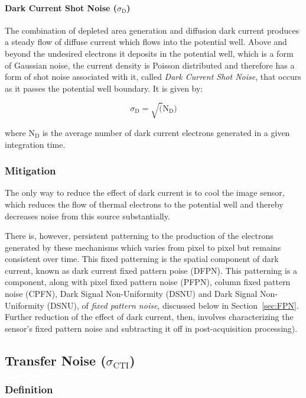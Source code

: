 \documentclass[10pt]{article}
\begin{document}
\paragraph{Dark Current Shot Noise (\boldmath $\sigma_{\text{D}}$)}
The combination of depleted area generation and diffusion dark current produces a steady flow of diffuse current which flows into the potential well. Above and beyond the undesired electrons it deposits in the potential well, which is a form of Gaussian noise, the current density is Poisson distributed and therefore has a form of shot noise associated with it, called \emph{Dark Current Shot Noise}, that occurs as it passes the potential well boundary. It is given by:

$$ \sigma_{\text{D}}=\sqrt (\text{N}_{\text{D}}) $$

\vspace{0.2cm}
\noindent where $\text{N}_{\text{D}}$  is the average number of dark current electrons generated in a given integration time.

\subsubsection{Mitigation}
\label{sec:DCMitigation}

The only way to reduce the effect of dark current is to cool the image sensor, which reduces the flow of thermal electrons to the potential well and thereby decreases noise from this source substantially. 

There is, however, persistent patterning to the production of the electrons generated by these mechanisms which varies from pixel to pixel but remains consistent over time. This fixed patterning is the spatial component of dark current, known as dark current fixed pattern poise (DFPN).  This patterning is a component, along with pixel fixed pattern noise (PFPN), column fixed pattern noise (CPFN), Dark Signal Non-Uniformity (DSNU) and Dark Signal Non-Uniformity (DSNU), of \emph{fixed pattern noise}, discussed below in Section~\ref{sec:FPN}. Further reduction of the effect of dark current, then, involves characterizing the sensor's fixed pattern noise and subtracting it off in post-acquisition processing).

\subsection{Transfer Noise (\boldmath $\sigma_{\text{CTI}}$)}
\label{sec:transfer}
\subsubsection{Definition}
\end{document}
